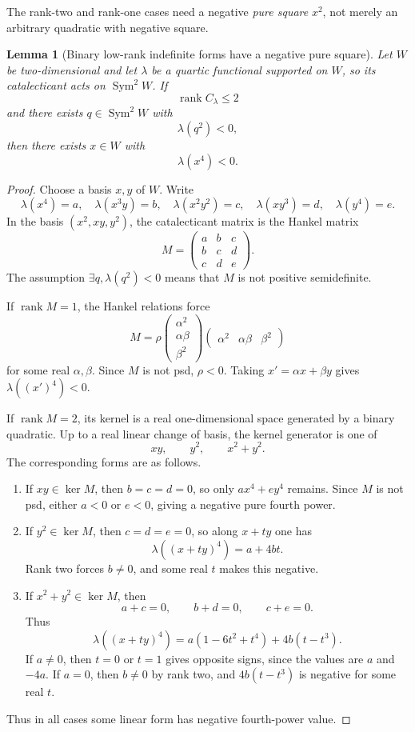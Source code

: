 \documentclass[11pt]{article}
\newtheorem{lemma}[theorem]{Lemma}
\newcommand{\rank}{\operatorname{rank}}
\newcommand{\Sym}{\operatorname{Sym}}
\begin{document}
The rank-two and rank-one cases need a negative \emph{pure square} \(x^2\), not merely an arbitrary quadratic with negative square.

\begin{lemma}[Binary low-rank indefinite forms have a negative pure square]\label{lem:binary-negative-square}
Let \(W\) be two-dimensional and let \(\lambda\) be a quartic functional supported on \(W\), so its catalecticant acts on \(\Sym^2W\).  If
\[
\rank C_\lambda\le2
\]
and there exists \(q\in\Sym^2W\) with
\[
\lambda(q^2)<0,
\]
then there exists \(x\in W\) with
\[
\lambda(x^4)<0.
\]
\end{lemma}

\begin{proof}
Choose a basis \(x,y\) of \(W\).  Write
\[
\lambda(x^4)=a,
\quad
\lambda(x^3y)=b,
\quad
\lambda(x^2y^2)=c,
\quad
\lambda(xy^3)=d,
\quad
\lambda(y^4)=e.
\]
In the basis \((x^2,xy,y^2)\), the catalecticant matrix is the Hankel matrix
\[
M=
\begin{pmatrix}
a&b&c\\
b&c&d\\
c&d&e
\end{pmatrix}.
\]
The assumption \(\exists q,\lambda(q^2)<0\) means that \(M\) is not positive semidefinite.

If \(\rank M=1\), the Hankel relations force
\[
M=\rho
\begin{pmatrix}
\alpha^2\\ \alpha\beta\\ \beta^2
\end{pmatrix}
\begin{pmatrix}
\alpha^2&\alpha\beta&\beta^2
\end{pmatrix}
\]
for some real \(\alpha,\beta\).  Since \(M\) is not psd, \(\rho<0\).  Taking \(x'=\alpha x+\beta y\) gives \(\lambda((x')^4)<0\).

If \(\rank M=2\), its kernel is a real one-dimensional space generated by a binary quadratic.  Up to a real linear change of basis, the kernel generator is one of
\[
xy,
\qquad
y^2,
\qquad
x^2+y^2.
\]
The corresponding forms are as follows.

\begin{enumerate}[label=(\roman*)]
\item If \(xy\in\ker M\), then \(b=c=d=0\), so only \(a x^4+e y^4\) remains.  Since \(M\) is not psd, either \(a<0\) or \(e<0\), giving a negative pure fourth power.

\item If \(y^2\in\ker M\), then \(c=d=e=0\), so along \(x+ty\) one has
\[
\lambda((x+ty)^4)=a+4bt.
\]
Rank two forces \(b\ne0\), and some real \(t\) makes this negative.

\item If \(x^2+y^2\in\ker M\), then
\[
a+c=0,
\qquad b+d=0,
\qquad c+e=0.
\]
Thus
\[
\lambda((x+ty)^4)=a(1-6t^2+t^4)+4b(t-t^3).
\]
If \(a\ne0\), then \(t=0\) or \(t=1\) gives opposite signs, since the values are \(a\) and \(-4a\).  If \(a=0\), then \(b\ne0\) by rank two, and \(4b(t-t^3)\) is negative for some real \(t\).
\end{enumerate}
Thus in all cases some linear form has negative fourth-power value.
\end{proof}
\end{document}
